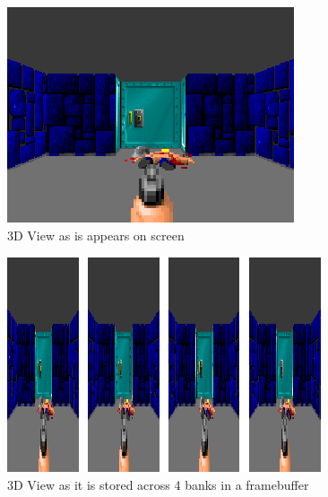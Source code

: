 \documentclass[book.tex]{subfiles}
\begin{document}
\begin{figure}[H]
\centering
 \includegraphics[width=\textwidth]{imgs/vga_layout/wolf3d_7.png}
 \caption{3D View as is appears on screen} \label{fig:vga_layout_in_3D}
 \end{figure}
 \par
 \begin{figure}[H]
\centering
 \includegraphics[width=\textwidth]{imgs/vga_layout/wolf3d_7_bank.png}
 \caption{3D View as it is stored across 4 banks in a framebuffer}
 \end{figure}
\end{document}
